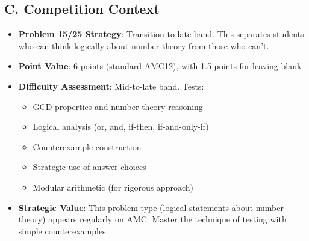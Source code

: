 \documentclass[12pt]{article}
\begin{document}
\begin{competitionbox}
\subsection*{C. Competition Context}
\begin{itemize}[leftmargin=*]
    \item \textbf{Problem 15/25 Strategy}: Transition to late-band. This separates students who can think logically about number theory from those who can't.
    \item \textbf{Point Value}: 6 points (standard AMC12), with 1.5 points for leaving blank
    \item \textbf{Difficulty Assessment}: Mid-to-late band. Tests:
    \begin{itemize}
        \item GCD properties and number theory reasoning
        \item Logical analysis (or, and, if-then, if-and-only-if)
        \item Counterexample construction
        \item Strategic use of answer choices
        \item Modular arithmetic (for rigorous approach)
    \end{itemize}
    \item \textbf{Strategic Value}: This problem type (logical statements about number theory) appears regularly on AMC. Master the technique of testing with simple counterexamples.
\end{itemize}
\end{competitionbox}
\end{document}
